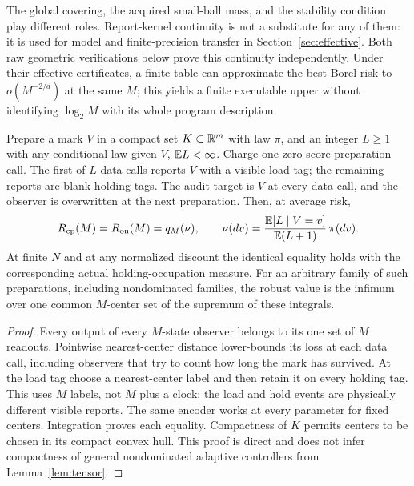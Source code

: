 The global covering, the acquired small-ball mass, and the stability condition play different roles. Report-kernel continuity is not a substitute for any of them: it is used for model and finite-precision transfer in Section~\ref{sec:effective}. Both raw geometric verifications below prove this continuity independently. Under their effective certificates, a finite table can approximate the best Borel risk to $o(M^{-2/d})$ at the same $M$; this yields a finite executable upper without identifying $\log_2M$ with its whole program description.

\begin{theorem}\label{thm:holding}
Prepare a mark $V$ in a compact set $K\subset\mathbb R^m$ with law $\pi$, and an integer $L\ge1$ with any conditional law given $V$, $\mathbb E L<\infty$. Charge one zero-score preparation call. The first of $L$ data calls reports $V$ with a visible load tag; the remaining reports are blank holding tags. The audit target is $V$ at every data call, and the observer is overwritten at the next preparation. Then, at average risk,
\begin{equation}\label{eq:holding}
 R_{\mathrm{cp}}(M)=R_{\mathrm{on}}(M)=q_M(\nu),\qquad
 \nu(dv)=\frac{\mathbb E[L\mid V=v]}{\mathbb E(L+1)}\,\pi(dv).
\end{equation}
At finite $N$ and at any normalized discount the identical equality holds with the corresponding actual holding-occupation measure. For an arbitrary family of such preparations, including nondominated families, the robust value is the infimum over one common $M$-center set of the supremum of these integrals.
\end{theorem}
\begin{proof}
Every output of every $M$-state observer belongs to its one set of $M$ readouts. Pointwise nearest-center distance lower-bounds its loss at each data call, including observers that try to count how long the mark has survived. At the load tag choose a nearest-center label and then retain it on every holding tag. This uses $M$ labels, not $M$ plus a clock: the load and hold events are physically different visible reports. The same encoder works at every parameter for fixed centers. Integration proves each equality. Compactness of $K$ permits centers to be chosen in its compact convex hull. This proof is direct and does not infer compactness of general nondominated adaptive controllers from Lemma~\ref{lem:tensor}.
\end{proof}


